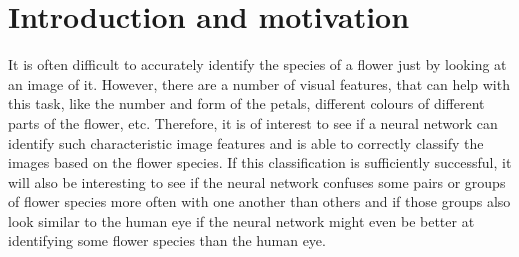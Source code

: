 \section{Introduction and motivation}
\label{sec:motivation}
It is often difficult to accurately identify the species of a flower just by looking at an image of it. 
However, there are a number of visual features, that can help with this task, like the number and form of the petals, different colours of different parts of the flower, etc.
Therefore, it is of interest to see if a neural network can identify such characteristic image features and is able to correctly classify the images based on the flower species.
If this classification is sufficiently successful, it will also be interesting to see if the neural network confuses some pairs or groups of flower species more often with one another than others
and if those groups also look similar to the human eye if the neural network might even be better at identifying some flower species than the human eye.
